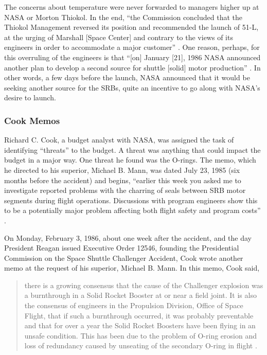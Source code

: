 The concerns about temperature were never forwarded to managers higher up at NASA or Morton Thiokol. In the end, ``the Commission concluded that the Thiokol Management reversed its position and recommended the launch of 51-L, at the urging of Marshall [Space Center] and contrary to the views of its engineers in order to accommodate a major customer'' \cite[vol. 1, p. 104]{rogers}. One reason, perhaps, for this overruling of the engineers is that ``[on] January [21], 1986 NASA announced another plan to develop a second source for shuttle [solid] motor production'' \cite{gao86,gao89}. In other words, a few days before the launch, NASA announced that it would be seeking another source for the SRBs, quite an incentive to go along with NASA's desire to launch.

\subsubsection{Cook Memos}

Richard C. Cook, a budget analyst with NASA, was assigned the task of identifying ``threats'' to the budget. A threat was anything that could impact the budget in a major way. One threat he found was the O-rings. The memo, which he directed to his superior, Michael B. Mann, was dated July 23, 1985 (six months before the accident) and begins, ``earlier this week you asked me to investigate reported problems with the charring of seals between SRB motor segments during flight operations. Discussions with program engineers show this to be a potentially major problem affecting both flight safety and program costs'' \cite[vol. 4, p. 391]{rogers}.

On Monday, February 3, 1986, about one week after the accident, and the day President Reagan issued Executive Order 12546, founding the Presidential Commission on the Space Shuttle Challenger Accident, Cook wrote another memo at the request of his superior, Michael B. Mann. In this memo, Cook said,

\begin{singlespace}
\begin{quotation}
\noindent
there is a growing consensus that the cause of the Challenger explosion was a burnthrough in a Solid Rocket Booster at or near a field joint. It is also the consensus of engineers in the Propulsion Division, Office of Space Flight, that if such a burnthrough occurred, it was probably preventable and that for over a year the Solid Rocket Boosters have been flying in an unsafe condition. This has been due to the problem of O-ring erosion and loss of redundancy caused by unseating of the secondary O-ring in flight \cite[vol. 4, p. 393]{rogers}.
\end{quotation}
\end{singlespace}
